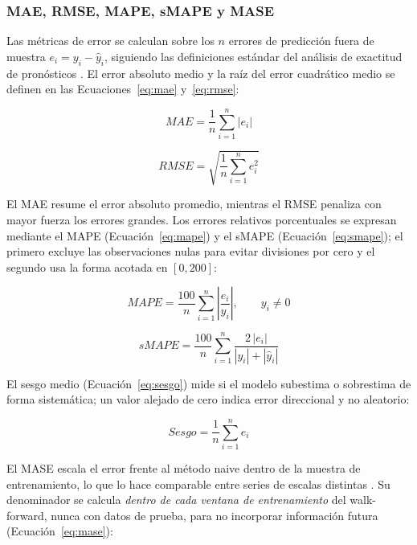 \documentclass[12pt,letterpaper]{article}
\providecommand{\parencite}{\citep}
\begin{document}
\subsubsection{MAE, RMSE, MAPE, sMAPE y MASE}

Las métricas de error se calculan sobre los $n$ errores de predicción fuera de muestra $e_i=y_i-\hat{y}_i$, siguiendo las definiciones estándar del análisis de exactitud de pronósticos \parencite{hyndman_koehler2006,hyndman2021fpp3}. El error absoluto medio y la raíz del error cuadrático medio se definen en las Ecuaciones~\ref{eq:mae} y~\ref{eq:rmse}:

\begin{equation}
MAE=\frac{1}{n}\sum_{i=1}^{n}|e_i|
\label{eq:mae}
\end{equation}

\begin{equation}
RMSE=\sqrt{\frac{1}{n}\sum_{i=1}^{n}e_i^{2}}
\label{eq:rmse}
\end{equation}

El MAE resume el error absoluto promedio, mientras el RMSE penaliza con mayor fuerza los errores grandes. Los errores relativos porcentuales se expresan mediante el MAPE (Ecuación~\ref{eq:mape}) y el sMAPE (Ecuación~\ref{eq:smape}); el primero excluye las observaciones nulas para evitar divisiones por cero y el segundo usa la forma acotada en $[0,200]$:

\begin{equation}
MAPE=\frac{100}{n}\sum_{i=1}^{n}\left|\frac{e_i}{y_i}\right|,\qquad y_i\neq0
\label{eq:mape}
\end{equation}

\begin{equation}
sMAPE=\frac{100}{n}\sum_{i=1}^{n}\frac{2\,|e_i|}{|y_i|+|\hat{y}_i|}
\label{eq:smape}
\end{equation}

El sesgo medio (Ecuación~\ref{eq:sesgo}) mide si el modelo subestima o sobrestima de forma sistemática; un valor alejado de cero indica error direccional y no aleatorio:

\begin{equation}
Sesgo=\frac{1}{n}\sum_{i=1}^{n}e_i
\label{eq:sesgo}
\end{equation}

El MASE escala el error frente al método naive dentro de la muestra de entrenamiento, lo que lo hace comparable entre series de escalas distintas \parencite{hyndman_koehler2006}. Su denominador se calcula \emph{dentro de cada ventana de entrenamiento} del walk-forward, nunca con datos de prueba, para no incorporar información futura (Ecuación~\ref{eq:mase}):
\end{document}
